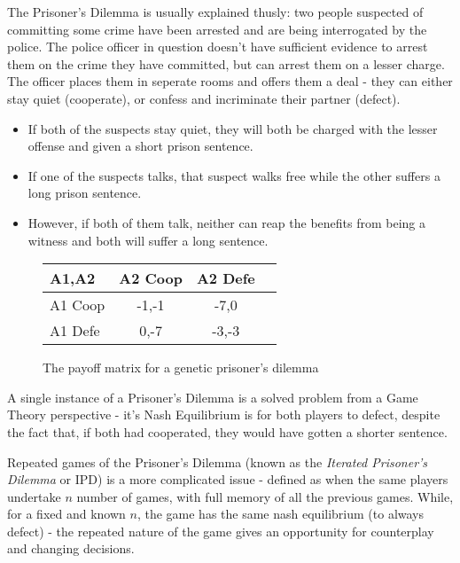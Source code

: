 \documentclass{article}
\begin{document}
The Prisoner's Dilemma is usually explained thusly: two people suspected of committing some crime have been arrested and are being interrogated by the police. The police officer in question doesn't have sufficient evidence to arrest them on the crime they have committed, but can arrest them on a lesser charge. The officer places them in seperate rooms and offers them a deal - they can either stay quiet (cooperate), or confess and incriminate their partner (defect).
\begin{itemize}
	\item If both of the suspects stay quiet, they will both be charged with the lesser offense and given a short prison sentence.
	\item If one of the suspects talks, that suspect walks free while the other suffers a long prison sentence.
	\item However, if both of them talk, neither can reap the benefits from being a witness and both will suffer a long sentence.
\end{itemize}
	\begin{figure}
		\label{fig:generic-prisoners-dilemma}
		\caption{The payoff matrix for a genetic prisoner's dilemma}
		\begin{tabular}{| l || c | c | c |}
			\hline
			A1,A2 & A2 Coop & A2 Defe \\ \hline
			A1 Coop & -1,-1 & -7,0 \\ \hline  
			A1 Defe & 0,-7 & -3,-3  \\ \hline
		\end{tabular}
	\end{figure}

A single instance of a Prisoner's Dilemma is a solved problem from a Game Theory perspective - it's Nash Equilibrium is for both players to defect, despite the fact that, if both had cooperated, they would have gotten a shorter sentence.

Repeated games of the Prisoner's Dilemma (known as the \emph{Iterated Prisoner's Dilemma} or IPD) is a more complicated issue - defined as when the same players undertake $n$ number of games, with full memory of all the previous games. While, for a fixed and known $n$, the game has the same nash equilibrium (to always defect) - the repeated nature of the game gives an opportunity for counterplay and changing decisions.
\end{document}
